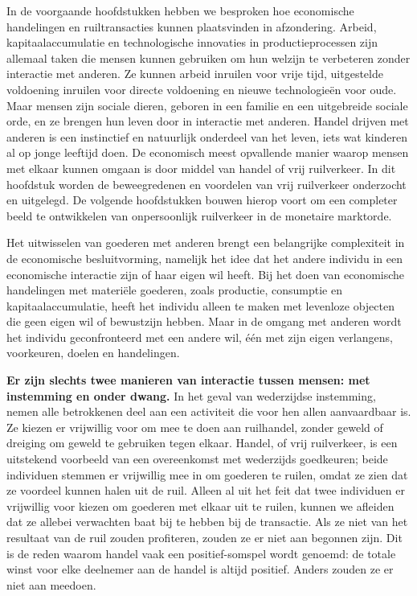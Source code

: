 \documentclass[
  a5paper,
  smalldemyvopaper,11pt,twoside,onecolumn,openright,extrafontsizes,
hidelinks]{memoir}
\begin{document}
In de voorgaande hoofdstukken hebben we besproken hoe economische
handelingen en ruiltransacties kunnen plaatsvinden in afzondering.
Arbeid, kapitaalaccumulatie en technologische innovaties in
productieprocessen zijn allemaal taken die mensen kunnen gebruiken om
hun welzijn te verbeteren zonder interactie met anderen. Ze kunnen
arbeid inruilen voor vrije tijd, uitgestelde voldoening inruilen voor
directe voldoening en nieuwe technologieën voor oude. Maar mensen zijn
sociale dieren, geboren in een familie en een uitgebreide sociale orde,
en ze brengen hun leven door in interactie met anderen. Handel drijven
met anderen is een instinctief en natuurlijk onderdeel van het leven,
iets wat kinderen al op jonge leeftijd doen. De economisch meest
opvallende manier waarop mensen met elkaar kunnen omgaan is door middel
van handel of vrij ruilverkeer. In dit hoofdstuk worden de beweegredenen
en voordelen van vrij ruilverkeer onderzocht en uitgelegd. De volgende
hoofdstukken bouwen hierop voort om een completer beeld te ontwikkelen
van onpersoonlijk ruilverkeer in de monetaire marktorde.

Het uitwisselen van goederen met anderen brengt een belangrijke
complexiteit in de economische besluitvorming, namelijk het idee dat het
andere individu in een economische interactie zijn of haar eigen wil
heeft. Bij het doen van economische handelingen met materiële goederen,
zoals productie, consumptie en kapitaalaccumulatie, heeft het individu
alleen te maken met levenloze objecten die geen eigen wil of bewustzijn
hebben. Maar in de omgang met anderen wordt het individu geconfronteerd
met een andere wil, één met zijn eigen verlangens, voorkeuren, doelen en
handelingen.

\textbf{Er zijn slechts twee manieren van interactie tussen mensen: met
instemming en onder dwang.} In het geval van wederzijdse instemming,
nemen alle betrokkenen deel aan een activiteit die voor hen allen
aanvaardbaar is. Ze kiezen er vrijwillig voor om mee te doen aan
ruilhandel, zonder geweld of dreiging om geweld te gebruiken tegen
elkaar. Handel, of vrij ruilverkeer, is een uitstekend voorbeeld van een
overeenkomst met wederzijds goedkeuren; beide individuen stemmen er
vrijwillig mee in om goederen te ruilen, omdat ze zien dat ze voordeel
kunnen halen uit de ruil. Alleen al uit het feit dat twee individuen er
vrijwillig voor kiezen om goederen met elkaar uit te ruilen, kunnen we
afleiden dat ze allebei verwachten baat bij te hebben bij de transactie.
Als ze niet van het resultaat van de ruil zouden profiteren, zouden ze
er niet aan begonnen zijn. Dit is de reden waarom handel vaak een
positief-somspel wordt genoemd: de totale winst voor elke deelnemer aan
de handel is altijd positief. Anders zouden ze er niet aan meedoen.
\end{document}
